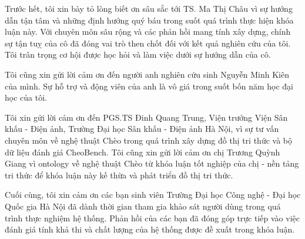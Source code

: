 Trước hết, tôi xin bày tỏ lòng biết ơn sâu sắc tới TS. Ma Thị Châu vì sự hướng dẫn tận tâm và những định hướng quý báu trong suốt quá trình thực hiện khóa luận này. Với chuyên môn sâu rộng và các phản hồi mang tính xây dựng, chính sự tận tuỵ của cô đã đóng vai trò then chốt đối với kết quả nghiên cứu của tôi. Tôi trân trọng cơ hội được học hỏi và làm việc dưới sự hướng dẫn của cô.

Tôi cũng xin gửi lời cảm ơn đến người anh nghiên cứu sinh Nguyễn Minh Kiên của mình. Sự hỗ trợ và động viên của anh là vô giá trong suốt bốn năm học đại học của tôi.

Tôi xin gửi lời cảm ơn đến PGS.TS Đinh Quang Trung, Viện trưởng Viện Sân khấu - Điện ảnh, Trường Đại học Sân khấu - Điện ảnh Hà Nội, vì sự tư vấn chuyên môn về nghệ thuật Chèo trong quá trình xây dựng đồ thị tri thức và bộ dữ liệu đánh giá CheoBench. Tôi cũng xin gửi lời cảm ơn chị Trương Quỳnh Giang vì ontology về nghệ thuật Chèo từ khóa luận tốt nghiệp của chị - nền tảng tri thức để khóa luận này kế thừa và phát triển đồ thị tri thức.

Cuối cùng, tôi xin cảm ơn các bạn sinh viên Trường Đại học Công nghệ - Đại học Quốc gia Hà Nội đã dành thời gian tham gia khảo sát người dùng trong quá trình thực nghiệm hệ thống. Phản hồi của các bạn đã đóng góp trực tiếp vào việc đánh giá tính khả thi và chất lượng của hệ thống được đề xuất trong khóa luận.
